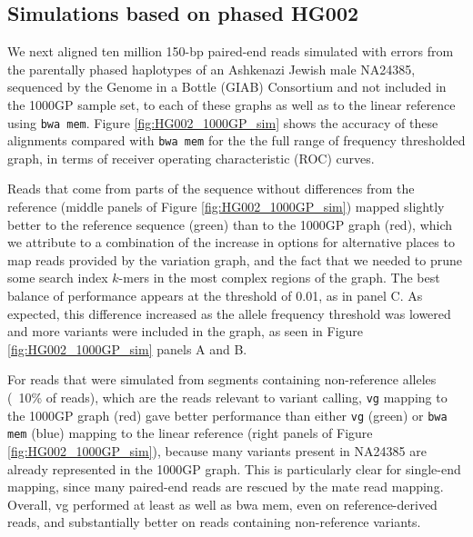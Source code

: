 \subsection{Simulations based on phased HG002}
\label{sec:1000GP_sim}

We next aligned ten million 150-bp paired-end reads simulated with errors from the parentally phased haplotypes of an Ashkenazi Jewish male NA24385, sequenced by the Genome in a Bottle (GIAB) Consortium \cite{zook2016extensive} and not included in the 1000GP sample set, to each of these graphs as well as to the linear reference using {\tt bwa mem}.
Figure \ref{fig:HG002_1000GP_sim} shows the accuracy of these alignments compared with {\tt bwa mem} for the the full range of frequency thresholded graph, in terms of receiver operating characteristic (ROC) curves.

Reads that come from parts of the sequence without differences from the reference (middle panels of Figure \ref{fig:HG002_1000GP_sim}) mapped slightly better to the reference sequence (green) than to the 1000GP graph (red), which we attribute to a combination of the increase in options for alternative places to map reads provided by the variation graph, and the fact that we needed to prune some search index $k$-mers in the most complex regions of the graph.
The best balance of performance appears at the threshold of 0.01, as in panel C.
As expected, this difference increased as the allele frequency threshold was lowered and more variants were included in the graph, as seen in Figure \ref{fig:HG002_1000GP_sim} panels A and B.

For reads that were simulated from segments containing non-reference alleles (~10\% of reads), which are the reads relevant to variant calling, {\tt vg} mapping to the 1000GP graph (red) gave better performance than either {\tt vg} (green) or {\tt bwa mem} (blue) mapping to the linear reference (right panels of Figure \ref{fig:HG002_1000GP_sim}), because many variants present in NA24385 are already represented in the 1000GP graph.
This is particularly clear for single-end mapping, since many paired-end reads are rescued by the mate read mapping.
Overall, vg performed at least as well as bwa mem, even on reference-derived reads, and substantially better on reads containing non-reference variants.

